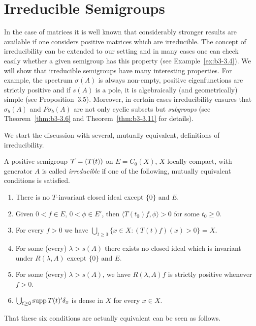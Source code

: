 \section{Irreducible Semigroups}%
In the case of matrices it is well known that considerably stronger results are available if one considers positive matrices which are irreducible. 
The concept of irreducibility can be extended to our setting and in many cases one can check easily whether a given semi­group has this property (see Example~\ref{ex:b3-3.4}). 
We will show that irreducible semigroups have many interesting properties. 
For example, the spectrum $\sigma(A)$ is always non-empty, positive eigenfunctions are strictly positive and if $s(A)$ is a pole, it is algebraically (and geometri­cally) simple (see Proposition~3.5). 
Moreover, in certain cases irreducibili­ty ensures that $\sigma_{b}(A)$ and $P\sigma_{b}(A)$ are not only cyclic subsets but \emph{subgroups} (see Theorem~\ref{thm:b3-3.6} and Theorem~\ref{thm:b3-3.11} for details). 

We start the discussion with several, mutually equivalent, definitions of irreducibility. 
\begin{definition}\label{def:b3-3.1}
A positive semigroup $\mathcal{T} = (T(t))$ on $E = C_{0}(X)$, $X$ locally compact, with generator $A$ is called \emph{irreducible} if one of the following, mutually equivalent conditions is satisfied.
\begin{enumerate}[\upshape (a)]

\item\label{item:b3-3.1-i}
There is no $T$-invariant closed ideal except $\{0\}$ and $E$.
	
\item\label{item:b3-3.1-ii}
Given $0 < f \in E$, $0 < \phi \in E'$, then $\langle T(t_{0})f,\phi \rangle > 0$ for some $t_{0} \geq 0$.
	
\item
For every $f > 0$ we have 
$\bigcup_{t \geq 0}\{x \in X : (T(t)f)(x) > 0\} = X$.
	
\item
For some (every) $\lambda > s(A)$ there exists no closed ideal which is invariant under $R(\lambda,A)$ except $\{0\}$ and $E$.
	
\item
For some (every) $\lambda > s(A)$, we have $R(\lambda,A)f$ is strictly positive whenever $f > 0$.
	
\item
$\bigcup_{t \geq 0}\mathop{}\!\mathrm{supp}\, T(t)'\delta_{x}$ is dense in $X$ for every $x \in X$.

\end{enumerate}
\end{definition}
That these six conditions are actually equivalent can be seen as follows.

